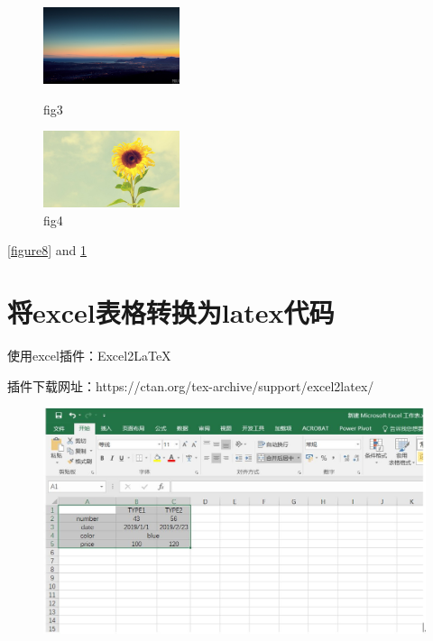 \documentclass[12pt]{elegantpaper} %
\begin{document}
\begin{figure}[htpb]
	\centering
	\begin{minipage}{0.5\textwidth}
		\centering
		\includegraphics[width=4cm]{figure/demo.jpg}
		\caption{fig3}
		\label{figure8}
	\end{minipage}
    \qquad
    \begin{minipage}{0.5\textwidth}
        \centering
        \includegraphics[width=4cm]{figure/demo1.jpg}
        \caption{fig4}
        \label{figure9}
    \end{minipage}
\end{figure}
	
\ref{figure8} and \ref{figure9}	

\section{将excel表格转换为latex代码}
使用excel插件：Excel2LaTeX

插件下载网址：https://ctan.org/tex-archive/support/excel2latex/

\begin{figure}	
	\centering	
	\includegraphics[width=\linewidth]{figure/excel1.jpg}	
\end{figure}
\end{document}
